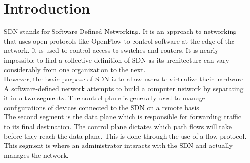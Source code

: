 \section{\normalsize Introduction}
{SDN stands for Software Defined Networking. It is an approach to networking that uses open protocols like OpenFlow to control software at the edge of the network. It is used to control access to switches and routers. It is nearly impossible to find a collective definition of SDN as its architecture can vary considerably from one organization to the next.\\ However, the basic purpose of SDN is to allow users to virtualize their hardware. A software-defined network attempts to build a computer network by separating it into two segments. The control plane is generally used to manage configurations of devices connected to the SDN on a remote basis.\\The second segment is the data plane which is responsible for forwarding traffic to its final destination. The control plane dictates which path flows will take before they reach the data plane. This is done through the use of a flow protocol. This segment is where an administrator interacts with the SDN and actually manages the network.
}
